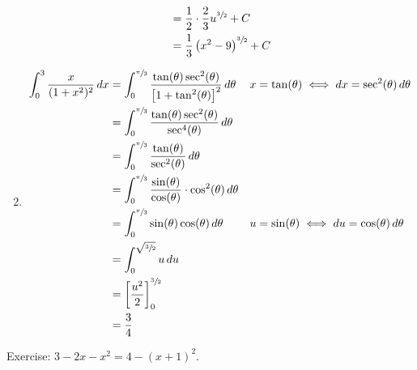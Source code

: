 \begin{Example}{}{}
\begin{enumerate}[label=(\roman*)]
\begin{align*}
                   & =\frac{1}{2} \cdot \frac{2}{3} u^{\sfrac{3}{2}}+C                            \\
                   & =\frac{1}{3}\left( x^2-9 \right)^{\sfrac{3}{2}}+C
              \end{align*}
        \item \begin{align*}
                  \int_{0}^{3} \frac{x}{(1+x^2)^2} \, d{x}
                   & =\int_{0}^{\sfrac{\pi}{3}}
                  \frac{\tan(\theta)\sec^2(\theta)}{\left[ 1+\tan^2(\theta) \right]^2} \, d{\theta}
                   &                                                                                              & x=\tan(\theta)\iff dx=\sec^2(\theta)\,d\theta                                               \\
                   & =\int_{0}^{\sfrac{\pi}{3}} \frac{\tan(\theta)\sec^2(\theta)}{\sec^4(\theta)} \, d{\theta}                                                                                                  \\
                   & =\int_{0}^{\sfrac{\pi}{3}} \frac{\tan(\theta)}{\sec^2(\theta)} \, d{\theta}                                                                                                                \\
                   & =\int_{0}^{\sfrac{\pi}{3}} \frac{\sin(\theta)}{\cos(\theta)}\cdot \cos^2(\theta)\, d{\theta}                                                                                               \\
                   & =\int_{0}^{\sfrac{\pi}{3}}\sin(\theta)\cos(\theta)\, d{\theta}                               &                                               & u=\sin(\theta)\iff du=\cos(\theta)\,d\theta \\
                   & =\int_{0}^{\sqrt{\sfrac{3}{2}}} u\, d{u}                                                                                                                                                   \\
                   & =\left[\frac{u^2}{2} \right]^{\sfrac{3}{2}}_0                                                                                                                                              \\
                   & =\frac{3}{4}
              \end{align*}
    \end{enumerate}
\end{Example}
Exercise: $ 3-2x-x^2=4-(x+1)^2 $.
